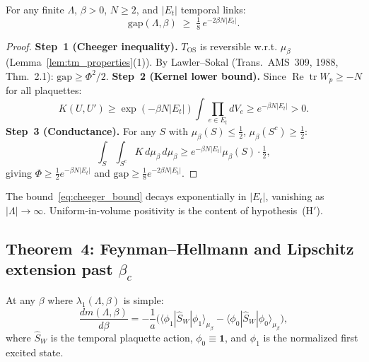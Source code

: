 \begin{theorem}
\label{thm:cheeger}
For any finite $\Lambda$, $\beta>0$, $N\ge 2$, and $|E_t|$ temporal links:
\begin{equation}
\label{eq:cheeger_bound}
  \mathrm{gap}(\Lambda,\beta) \;\ge\; \tfrac{1}{8}\,e^{-2\beta N|E_t|}.
\end{equation}
\end{theorem}

\begin{proof}
\textbf{Step~1 (Cheeger inequality).}
$T_{\mathrm{OS}}$ is reversible w.r.t. $\mu_\beta$
(Lemma~\ref{lem:tm_properties}(1)).
By Lawler--Sokal (Trans.~AMS~309, 1988, Thm.~2.1): $\mathrm{gap}\ge\Phi^2/2$.
\textbf{Step~2 (Kernel lower bound).}
Since $\operatorname{Re}\operatorname{tr}W_p\ge -N$ for all plaquettes:
\[
  K(U,U')
  \ge \exp(-\beta N|E_t|)\int\prod_{e\in E_t}dV_e
  \ge e^{-\beta N|E_t|} > 0.
\]
\textbf{Step~3 (Conductance).}
For any $S$ with $\mu_\beta(S)\le\tfrac{1}{2}$, $\mu_\beta(S^c)\ge\tfrac{1}{2}$:
\[
  \int_S\!\!\int_{S^c}K\,d\mu_\beta\,d\mu_\beta
  \ge e^{-\beta N|E_t|}\mu_\beta(S)\cdot\tfrac{1}{2},
\]
giving $\Phi\ge\tfrac{1}{2}e^{-\beta N|E_t|}$
and $\mathrm{gap}\ge\tfrac{1}{8}e^{-2\beta N|E_t|}$.
\end{proof}

\begin{remark}
The bound~\eqref{eq:cheeger_bound} decays exponentially in $|E_t|$,
vanishing as $|\Lambda|\to\infty$. Uniform-in-volume positivity is
the content of hypothesis~(H$'$).
\end{remark}
\subsection{Theorem~4: Feynman--Hellmann and Lipschitz extension past $\beta_c$}
\label{ssec:fh}

\begin{lemma}
\label{lem:fh}
At any $\beta$ where $\lambda_1(\Lambda,\beta)$ is simple:
\begin{equation}
\label{eq:fh}
  \frac{dm(\Lambda,\beta)}{d\beta}
  =-\frac{1}{a}\bigl(
    \langle\phi_1|\hat{S}_W|\phi_1\rangle_{\mu_\beta}
    -\langle\phi_0|\hat{S}_W|\phi_0\rangle_{\mu_\beta}
  \bigr),
\end{equation}
where $\hat{S}_W$ is the temporal plaquette action, $\phi_0\equiv\mathbf{1}$,
and $\phi_1$ is the normalized first excited state.
\end{lemma}

